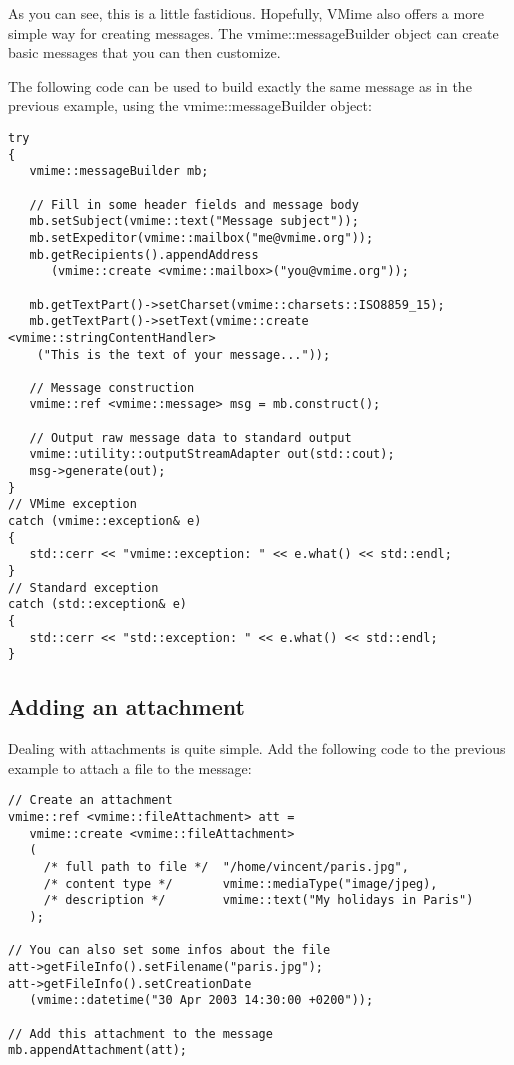 As you can see, this is a little fastidious. Hopefully, VMime also offers a
more simple way for creating messages. The {\vcode vmime::messageBuilder}
object can create basic messages that you can then customize.

The following code can be used to build exactly the same message as in the
previous example, using the {\vcode vmime::messageBuilder} object:

\begin{lstlisting}[caption={Building a simple message
using {\vcode vmime::messageBuilder}}]
try
{
   vmime::messageBuilder mb;

   // Fill in some header fields and message body
   mb.setSubject(vmime::text("Message subject"));
   mb.setExpeditor(vmime::mailbox("me@vmime.org"));
   mb.getRecipients().appendAddress
      (vmime::create <vmime::mailbox>("you@vmime.org"));

   mb.getTextPart()->setCharset(vmime::charsets::ISO8859_15);
   mb.getTextPart()->setText(vmime::create <vmime::stringContentHandler>
   	("This is the text of your message..."));

   // Message construction
   vmime::ref <vmime::message> msg = mb.construct();

   // Output raw message data to standard output
   vmime::utility::outputStreamAdapter out(std::cout);
   msg->generate(out);
}
// VMime exception
catch (vmime::exception& e)
{
   std::cerr << "vmime::exception: " << e.what() << std::endl;
}
// Standard exception
catch (std::exception& e)
{
   std::cerr << "std::exception: " << e.what() << std::endl;
}
\end{lstlisting}


\subsection{Adding an attachment} %

Dealing with attachments is quite simple. Add the following code to the
previous example to attach a file to the message:

\begin{lstlisting}[caption={Building a message with an attachment using
{\vcode vmime::messageBuilder}}]
// Create an attachment
vmime::ref <vmime::fileAttachment> att =
   vmime::create <vmime::fileAttachment>
   (
     /* full path to file */  "/home/vincent/paris.jpg",
     /* content type */       vmime::mediaType("image/jpeg),
     /* description */        vmime::text("My holidays in Paris")
   );

// You can also set some infos about the file
att->getFileInfo().setFilename("paris.jpg");
att->getFileInfo().setCreationDate
   (vmime::datetime("30 Apr 2003 14:30:00 +0200"));

// Add this attachment to the message
mb.appendAttachment(att);
\end{lstlisting}


